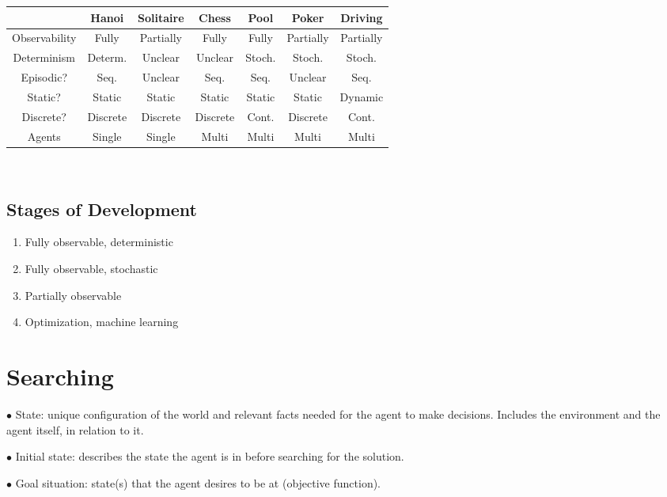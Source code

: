 \documentclass[english,openany]{book}
\begin{document}
    \begin{tabular}{|c|c|c|c|c|c|c|}
        \hline
        & Hanoi & Solitaire & Chess & Pool & Poker & Driving \\
        \hline
        Observability & Fully & Partially & Fully & Fully & Partially & Partially\\
        Determinism & Determ. & Unclear & Unclear & Stoch. & Stoch. & Stoch.\\
        Episodic? & Seq. & Unclear & Seq. & Seq. & Unclear & Seq.\\
        Static? & Static & Static & Static & Static & Static & Dynamic\\
        Discrete? & Discrete & Discrete & Discrete & Cont. & Discrete & Cont.\\
        Agents & Single & Single & Multi & Multi & Multi & Multi\\
        \hline
    \end{tabular}\\

    \subsection{Stages of Development}

    \begin{enumerate}
        \item Fully observable, deterministic

        \item Fully observable, stochastic

        \item Partially observable

        \item Optimization, machine learning
    \end{enumerate}

    \section{Searching}

    $\bullet$ State: unique configuration of the world and relevant facts needed for the agent to make decisions. Includes the environment and the agent itself, in relation to it.

    $\bullet$ Initial state: describes the state the agent is in before searching for the solution.

    $\bullet$ Goal situation: state(s) that the agent desires to be at (objective function).
\end{document}
